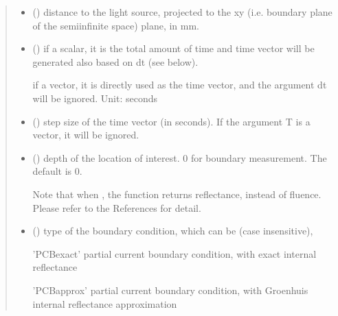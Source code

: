 \documentclass[letterpaper,10pt,english]{sphinxmanual}
\begin{document}
\begin{fulllineitems}
\begin{quote}
\begin{description}
\begin{itemize}
\item {} 
\sphinxAtStartPar
{} () \textendash{} distance to the light source, projected to the x\sphinxhyphen{}y (i.e. boundary plane of the semi\sphinxhyphen{}infinite space) plane, in mm.

\item {} 
\sphinxAtStartPar
{} () \textendash{} 
\sphinxAtStartPar
if a scalar, it is the total amount of time and time vector will be generated also based on dt (see below).

\sphinxAtStartPar
if a vector, it is directly used as the time vector, and the argument dt will be ignored. Unit: seconds


\item {} 
\sphinxAtStartPar
{} () \textendash{} step size of the time vector (in seconds). If the argument T is a vector, it will be ignored.

\item {} 
\sphinxAtStartPar
{} (\sphinxstyleliteralemphasis{\sphinxupquote{, }}) \textendash{} 
\sphinxAtStartPar
depth of the location of interest. 0 for boundary measurement. The default is 0.

\sphinxAtStartPar
Note that when , the function returns reflectance, instead of fluence. Please refer to the References for detail.


\item {} 
\sphinxAtStartPar
{} (\sphinxstyleliteralemphasis{\sphinxupquote{, }}) \textendash{} 
\sphinxAtStartPar
type of the boundary condition, which can be (case insensitive),

\sphinxAtStartPar
’PCB\sphinxhyphen{}exact’ \sphinxhyphen{} partial current boundary condition, with exact internal reflectance

\sphinxAtStartPar
’PCB\sphinxhyphen{}approx’ \sphinxhyphen{} partial current boundary condition, with Groenhuis internal reflectance approximation


\end{itemize}
\end{description}
\end{quote}
\end{fulllineitems}
\end{document}
